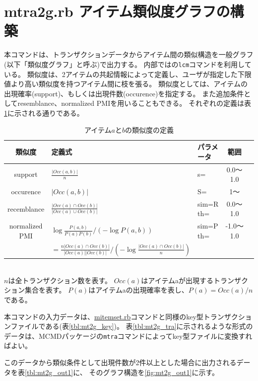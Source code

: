 
\section{mtra2g.rb アイテム類似度グラフの構築\label{sect:mtra2g}}

本コマンドは、トランザクションデータからアイテム間の類似構造を一般グラフ(以下「類似度グラフ」と呼ぶ)で出力する。
内部では\cite{UnoWeb}の\verb|lcm|コマンドを利用している。
類似度は、2アイテムの共起情報によって定義し、ユーザが指定した下限値より高い類似度を持つアイテム間に枝を張る。
類似度としては、アイテムの出現確率(support)、もしくは出現件数(occurence)を指定する。
また追加条件としてresemblance、normalized PMIを用いることもできる。
それぞれの定義は表\ref{tbl:mt2g_simdef}に示される通りである。

\begin{table}[htbp]
\begin{center}
\caption{アイテム$a$と$b$の類似度の定義\label{tbl:mt2g_simdef}}
\begin{tabular}{cllcc}
\hline
類似度&定義式&パラメータ&範囲 \\
\hline
support        & $\frac{|Occ(a,b)|}{n}$ & s= & 0.0〜1.0 \\
occurence      & $|Occ(a,b)|$ & S= & 1〜 \\
recemblance    & $\frac{|Occ(a) \cap Occ(b)|}{|Occ(a) \cup Occ(b)|}$ & sim=R th= & 0.0〜1.0\\
normalized PMI & $\log{\frac{P(a,b)}{P(a)P(b)}}/(-\log{P(a,b)})$ & sim=P th=  & -1.0〜1.0\\
               & $=\frac{n|Occ(a) \cap Occ(b)|}{|Occ(a)||Occ(b)|}/(-\log{\frac{|Occ(a) \cap Occ(b)|}{n}})$ & \\
\hline
\end{tabular} 
\\
{\scriptsize
$n$は全トランザクション数を表す。
$Occ(a)$はアイテムaが出現するトランザクション集合を表す。
$P(a)$はアイテムaの出現確率を表し、$P(a)=Occ(a)/n$である。
}
\end{center}
\end{table}

本コマンドの入力データは、\hyperref[sect:mitemset]{mitemset.rb}コマンドと同様のkey型トランザクションファイルである(表\ref{tbl:mt2g_key})。
表\ref{tbl:mt2g_tra}に示されるような形式のデータは、MCMDパッケージの\verb|mtra|コマンドによってkey型ファイルに変換すればよい。

このデータから類似条件として出現件数が2件以上とした場合に出力されるデータを表\ref{tbl:mt2g_out1}に、
そのグラフ構造を\ref{fig:mt2g_out1}に示す。



